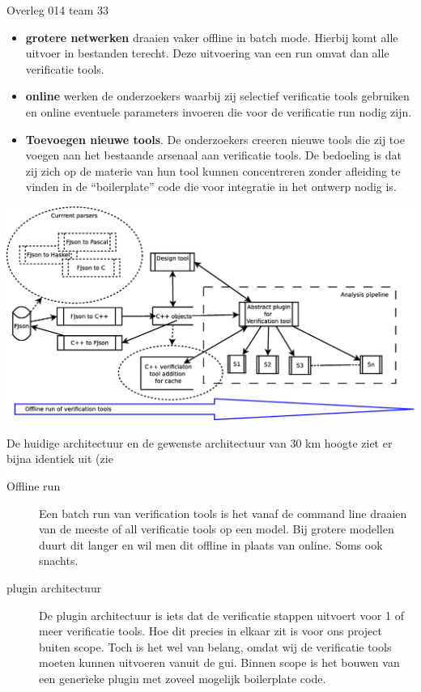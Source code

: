 \documentclass[a4paper,final]{article}
\begin{document}
\begin{Minutes}{Overleg 014 team 33}
\begin{itemize}
	\item {\bf grotere netwerken} draaien vaker offline in batch mode. Hierbij
		komt alle uitvoer in bestanden terecht. Deze uitvoering van een run
		omvat dan alle verificatie tools.

	\item {\bf online} werken de onderzoekers waarbij zij selectief verificatie
		tools gebruiken en online eventuele parameters invoeren die voor de
		verificatie run nodig zijn.

	\item {\bf Toevoegen nieuwe tools}. De onderzoekers creeren nieuwe tools
		die zij toe voegen aan het bestaande arsenaal aan verificatie tools. De
		bedoeling is dat zij zich op de materie van hun tool kunnen
		concentreren zonder afleiding te vinden in de ``boilerplate'' code die
		voor integratie in het ontwerp nodig is. 

\end{itemize}		


\includegraphics[width=.9\linewidth]{2014-11-27-meeting-architecture-tool}\label{}

De huidige architectuur en de gewenste architectuur van 30 km hoogte ziet er bijna identiek uit (zie 

\begin{description} 

	\item[Offline run] Een batch run van verification tools is het vanaf de
		command line draaien van de meeste of all verificatie tools op een
		model.  Bij grotere modellen duurt dit langer en wil men dit offline in
		plaats van online. Soms ook snachts.

	\item[plugin architectuur] De plugin architectuur is iets dat de verificatie
		stappen uitvoert voor 1 of meer verificatie tools. Hoe dit precies in
		elkaar zit is voor ons project buiten scope. Toch is het wel van belang, 
		omdat wij de verificatie tools moeten kunnen uitvoeren vanuit de gui.
		Binnen scope is het bouwen van een generieke plugin met zoveel mogelijk
		boilerplate code. 


\end{description}
\end{Minutes}
\end{document}

